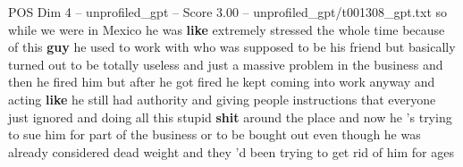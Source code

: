 \begin{textsample}{POS Dim 4 – unprofiled\_gpt – Score 3.00 – unprofiled\_gpt/t001308\_gpt.txt}  \label{ex:f4_pos_023}
so while we were in Mexico he was \textbf{like} extremely stressed the whole time because of this \textbf{guy} he used to work with who was supposed to be his friend but basically turned out to be totally useless and just a massive problem in the business and then he fired him but after he got fired he kept coming into work anyway and acting \textbf{like} he still had authority and giving people instructions that everyone just ignored and doing all this stupid \textbf{shit} around the place and now he ’s trying to sue him for part of the business or to be bought out even though he was already considered dead weight and they ’d been trying to get rid of him for ages

\end{textsample}
